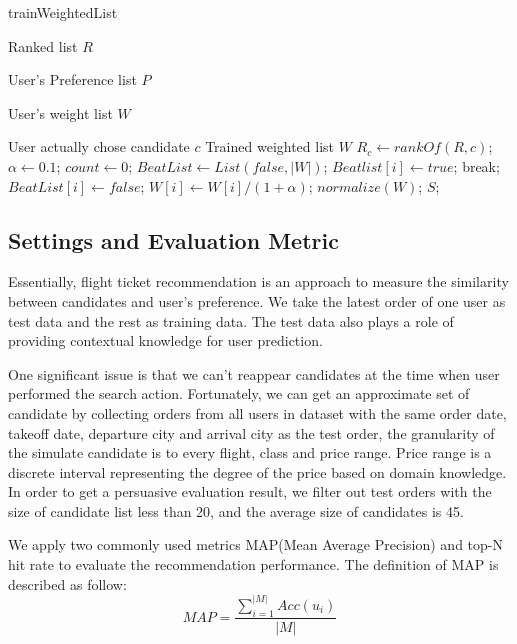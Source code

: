 \documentclass{sig-alternate-05-2015}
\begin{document}
\begin{algorithm}[htb]
\caption{trainWeightedList}
\label{alg4}
\begin{algorithmic}[1]
\REQUIRE \par
Ranked list $R$ \par
User's Preference list $P$ \par
User's weight list $W$ \par
User actually chose candidate $c$
\ENSURE Trained weighted list $W$
\STATE $R_c \leftarrow rankOf(R,c)$;
\STATE $\alpha \leftarrow 0.1$;
\STATE $count \leftarrow 0$;
\STATE $BeatList \leftarrow List(false,|W|)$;
\STATE $Beatlist[i] \leftarrow true$;
\STATE break;
\ENDIF
\ENDFOR
{}
\STATE $BeatList[i] \leftarrow false$;
\STATE $W[i] \leftarrow W[i] / (1+\alpha)$;
\ENDIF
\ENDFOR
\ENDWHILE
\STATE $normalize(W)$;
\RETURN $S$;
\end{algorithmic} 
\end{algorithm}


\subsection{Settings and Evaluation Metric}
Essentially, flight ticket recommendation is an approach to measure the similarity between candidates and user's preference. We take the latest order of one user as test data and the rest as training data. The test data also plays a role of providing contextual knowledge for user prediction.\par
One significant issue is that we can't reappear candidates at the time when user performed the search action. Fortunately, we can get an approximate set of candidate by collecting orders from all users in dataset with the same order date, takeoff date, departure city and arrival city as the test order, the granularity of the simulate candidate is to every flight, class and price range. Price range is a discrete interval representing the degree of the price based on domain knowledge. In order to get a persuasive evaluation result, we filter out test orders with the size of candidate list less than 20, and the average size of candidates is 45.\par
We apply two commonly used metrics MAP(Mean Average Precision) and top-N hit rate to evaluate the recommendation performance. The definition of MAP is described as follow:\\
\begin{equation}
MAP = \frac{\sum_{i=1}^{|M|}Acc(u_i)}{|M|}
\end{equation}
\end{document}
